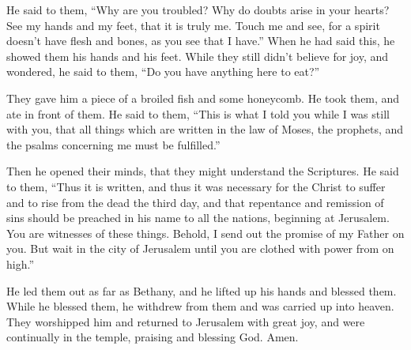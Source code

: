  He said to them, ``Why are you troubled? Why do doubts
arise in your hearts?  See my hands and my feet, that it
is truly me. Touch me and see, for a spirit doesn't have flesh and
bones, as you see that I have.''  When he had said this,
he showed them his hands and his feet.  While they still
didn't believe for joy, and wondered, he said to them, ``Do you have
anything here to eat?''

 They gave him a piece of a broiled fish and some
honeycomb.  He took them, and ate in front of them.
 He said to them, ``This is what I told you while I was
still with you, that all things which are written in the law of Moses,
the prophets, and the psalms concerning me must be fulfilled.''

 Then he opened their minds, that they might understand
the Scriptures.  He said to them, ``Thus it is written,
and thus it was necessary for the Christ to suffer and to rise from the
dead the third day,  and that repentance and remission of
sins should be preached in his name to all the nations, beginning at
Jerusalem.  You are witnesses of these things.
 Behold, I send out the promise of my Father on you. But
wait in the city of Jerusalem until you are clothed with power from on
high.''

 He led them out as far as Bethany, and he lifted up his
hands and blessed them.  While he blessed them, he
withdrew from them and was carried up into heaven.  They
worshipped him and returned to Jerusalem with great joy, 
and were continually in the temple, praising and blessing God. Amen.
